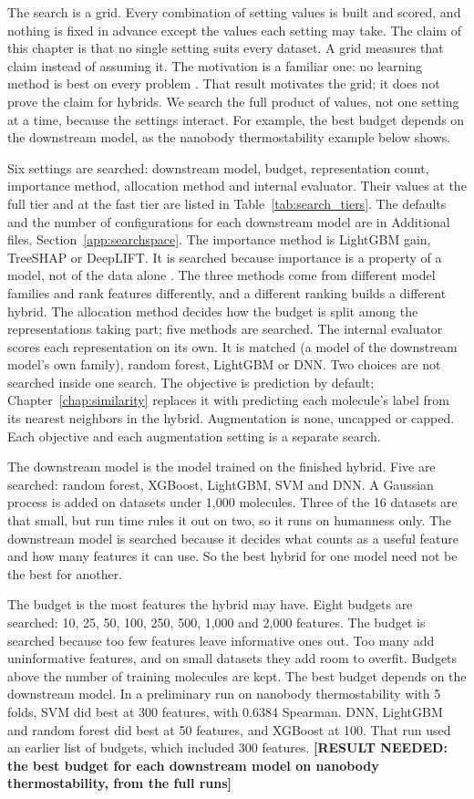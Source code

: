 The search is a grid. Every combination of setting values is built and scored, and nothing is fixed in advance except the values each setting may take. The claim of this chapter is that no single setting suits every dataset. A grid measures that claim instead of assuming it. The motivation is a familiar one: no learning method is best on every problem \citep{Wolpert1996}. That result motivates the grid; it does not prove the claim for hybrids. We search the full product of values, not one setting at a time, because the settings interact. For example, the best budget depends on the downstream model, as the nanobody thermostability example below shows.

Six settings are searched: downstream model, budget, representation count, importance method, allocation method and internal evaluator. Their values at the full tier and at the fast tier are listed in Table~\ref{tab:search_tiers}. The defaults and the number of configurations for each downstream model are in Additional files, Section~\ref{app:searchspace}. The importance method is LightGBM gain, TreeSHAP or DeepLIFT. It is searched because importance is a property of a model, not of the data alone \citep{Dong2020}. The three methods come from different model families and rank features differently, and a different ranking builds a different hybrid. The allocation method decides how the budget is split among the representations taking part; five methods are searched. The internal evaluator scores each representation on its own. It is matched (a model of the downstream model's own family), random forest, LightGBM or DNN. Two choices are not searched inside one search. The objective is prediction by default; Chapter~\ref{chap:similarity} replaces it with predicting each molecule's label from its nearest neighbors in the hybrid. Augmentation is none, uncapped or capped. Each objective and each augmentation setting is a separate search.

The downstream model is the model trained on the finished hybrid. Five are searched: random forest, XGBoost, LightGBM, SVM and DNN. A Gaussian process is added on datasets under 1,000 molecules. Three of the 16 datasets are that small, but run time rules it out on two, so it runs on humanness only. The downstream model is searched because it decides what counts as a useful feature and how many features it can use. So the best hybrid for one model need not be the best for another.

The budget is the most features the hybrid may have. Eight budgets are searched: 10, 25, 50, 100, 250, 500, 1,000 and 2,000 features. The budget is searched because too few features leave informative ones out. Too many add uninformative features, and on small datasets they add room to overfit. Budgets above the number of training molecules are kept. The best budget depends on the downstream model. In a preliminary run on nanobody thermostability with 5 folds, SVM did best at 300 features, with 0.6384 Spearman. DNN, LightGBM and random forest did best at 50 features, and XGBoost at 100. That run used an earlier list of budgets, which included 300 features. \textbf{[RESULT NEEDED: the best budget for each downstream model on nanobody thermostability, from the full runs]}

